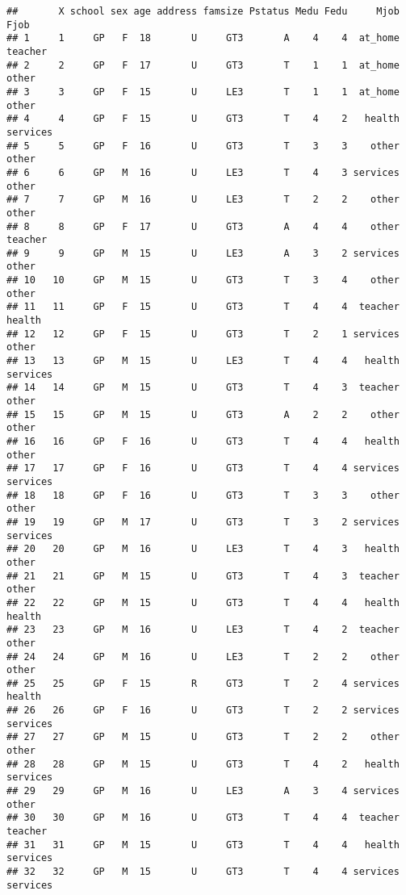 \documentclass[]{article}
\begin{document}
\begin{verbatim}
##       X school sex age address famsize Pstatus Medu Fedu     Mjob     Fjob
## 1     1     GP   F  18       U     GT3       A    4    4  at_home  teacher
## 2     2     GP   F  17       U     GT3       T    1    1  at_home    other
## 3     3     GP   F  15       U     LE3       T    1    1  at_home    other
## 4     4     GP   F  15       U     GT3       T    4    2   health services
## 5     5     GP   F  16       U     GT3       T    3    3    other    other
## 6     6     GP   M  16       U     LE3       T    4    3 services    other
## 7     7     GP   M  16       U     LE3       T    2    2    other    other
## 8     8     GP   F  17       U     GT3       A    4    4    other  teacher
## 9     9     GP   M  15       U     LE3       A    3    2 services    other
## 10   10     GP   M  15       U     GT3       T    3    4    other    other
## 11   11     GP   F  15       U     GT3       T    4    4  teacher   health
## 12   12     GP   F  15       U     GT3       T    2    1 services    other
## 13   13     GP   M  15       U     LE3       T    4    4   health services
## 14   14     GP   M  15       U     GT3       T    4    3  teacher    other
## 15   15     GP   M  15       U     GT3       A    2    2    other    other
## 16   16     GP   F  16       U     GT3       T    4    4   health    other
## 17   17     GP   F  16       U     GT3       T    4    4 services services
## 18   18     GP   F  16       U     GT3       T    3    3    other    other
## 19   19     GP   M  17       U     GT3       T    3    2 services services
## 20   20     GP   M  16       U     LE3       T    4    3   health    other
## 21   21     GP   M  15       U     GT3       T    4    3  teacher    other
## 22   22     GP   M  15       U     GT3       T    4    4   health   health
## 23   23     GP   M  16       U     LE3       T    4    2  teacher    other
## 24   24     GP   M  16       U     LE3       T    2    2    other    other
## 25   25     GP   F  15       R     GT3       T    2    4 services   health
## 26   26     GP   F  16       U     GT3       T    2    2 services services
## 27   27     GP   M  15       U     GT3       T    2    2    other    other
## 28   28     GP   M  15       U     GT3       T    4    2   health services
## 29   29     GP   M  16       U     LE3       A    3    4 services    other
## 30   30     GP   M  16       U     GT3       T    4    4  teacher  teacher
## 31   31     GP   M  15       U     GT3       T    4    4   health services
## 32   32     GP   M  15       U     GT3       T    4    4 services services

\end{verbatim}
\end{document}

